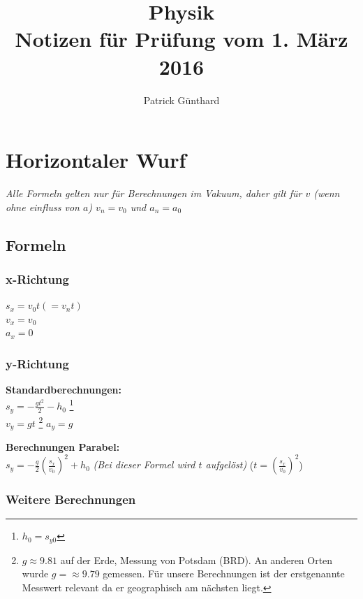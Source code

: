 \documentclass[10pt,a4paper,twoside]{article}
\title{\textbf{Physik}\\Notizen für Prüfung vom 1. März 2016}
\author{Patrick Günthard}
\begin{document}
	\maketitle
	\tableofcontents
	
	\clearpage
	
	\section{Horizontaler Wurf}
	\textit{Alle Formeln gelten nur für Berechnungen im Vakuum, daher gilt für \(v\) (wenn ohne einfluss von \(a\)) \(v_n = v_0\) und \(a_n = a_0\)}
	\subsection{Formeln}
	\subsubsection{x-Richtung}
	\begin{multicols}{2}
		\(s_x = v_0t ( = v_nt)\)\\
		\(v_x = v_0\)\\
		\(a_x = 0\)
	\end{multicols}
	\subsubsection{y-Richtung}
	\begin{multicols}{2}
		\textbf{Standardberechnungen:}\\
		
		\(s_y = - \frac{gt^2}{2} - h_0\) \footnote{\(h_0 = s_{y0}\)}  \\
		\(v_y = gt\) \footnote{\(g \approx 9.81\) auf der Erde, Messung von Potsdam (BRD). An anderen Orten wurde \(g = \approx 9.79\) gemessen. Für unsere Berechnungen ist der erstgenannte Messwert relevant da er geographisch am nächsten liegt.}
		\(a_y = g\) 
		
		\textbf{Berechnungen Parabel:}\\
		
		\(s_y = -\frac{g}{2}(\frac{s_x}{v_0})^2 + h_0\) \textit{(Bei dieser Formel wird \(t\) aufgelöst)} (\(t = (\frac{s_x}{v_0})^2\))
		
	\end{multicols}
	
	\subsubsection{Weitere Berechnungen}
	
\end{document}
